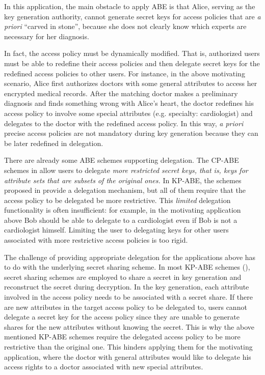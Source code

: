 \documentclass[twocolumn]{svjour3}          \smartqed  \usepackage{graphicx}
\begin{document}
In this application, the main obstacle to apply ABE is that Alice, serving as the key generation authority, cannot generate secret keys for access policies that are {\em a priori} 
``carv\-ed in stone'', because she does not clearly know which experts are necessary for her diagnosis.


In fact, the access policy must be dynamically modified. That is, authorized users must be able to redefine their access policies and then delegate secret keys for the redefined access policies to other users. For instance, in the above motivating scenario, Alice first authorizes doctors with some general attributes to access her encrypted medical records. After the matching doctor makes a preliminary diagnosis and finds something wrong with
Alice's heart, the doctor redefines his access policy to involve some special attributes (e.g. specialty: cardiologist) and delegates to the doctor with the redefined access policy. In this way,  {\em a priori} precise access policies are not mandatory during key generation because
they can be later redefined in delegation.

There are already some ABE schemes supporting delegation. The CP-ABE schemes in \cite{BSW07,GJP+08,Wat11} allow users to delegate 
{\em more restricted secret keys, that is, keys for attribute sets that are subsets of the original ones.} 
In KP-ABE, the schemes proposed in \cite{GPS+06,LW11,BNS13,RW13} provide a delegation mechanism, but all of them require that the access policy to be delegated be more restrictive. This {\em limited} delegation functionality is
often insufficient: for example, in the motivating
application above 
Bob should be able to delegate to a cardiologist even if Bob
is not a cardiologist himself.
Limiting the user to delegating keys for other users associated
with more restrictive access policies
is too rigid.

The challenge of providing appropriate delegation for the applications above
has to do with the underlying secret sharing scheme. In most KP-ABE schemes (\cite{GPS+06,LW11,RW13}), secret sharing schemes are employed to share a secret in key generation and reconstruct the secret during decryption. In the key generation, each attribute involved in the access policy needs to be associated with a secret share. If there are new attributes in the target access policy to be delegated to, users cannot delegate a secret key for the access policy since they are unable to generate shares for the new attributes without knowing
the secret. This is why the above mentioned KP-ABE schemes require the 
delegated access policy to be more restrictive than the original one. This hinders
applying them for the motivating application, where the doctor with general attributes would like to delegate his access rights to a 
doctor associated with
new special attributes.
\end{document}
